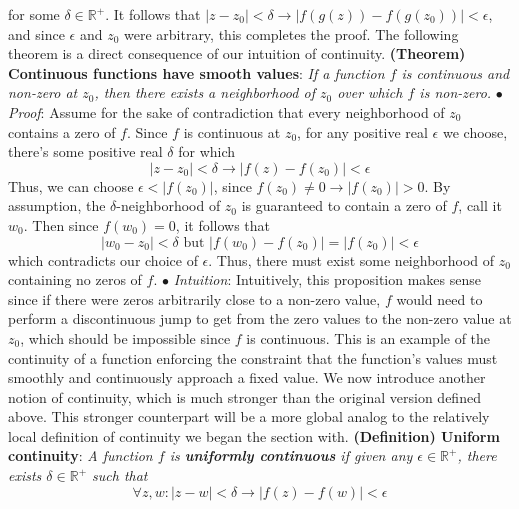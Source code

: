 \documentclass{article}
\newcommand*{\tb}{\textbf}
\newcommand*{\ti}{\textit}
\newcommand*{\n}{\newline}
\newcommand*{\nn}{\newline \newline}
\newcommand*{\Pf}{\indent \ensuremath{\bullet} \textit{Proof}: }
\newcommand*{\In}{\indent \ensuremath{\bullet} \textit{Intuition}: }
\newcommand*{\R}{\mathbb{R}}
\begin{document}
for some $ \delta \in \R^+ $. It follows that $ | z - z_0 | < \delta \rightarrow | f(g(z)) - f(g(z_0)) | < \epsilon $, and since $ \epsilon $ and $ z_0 $ were arbitrary, this completes the proof. \qedsymbol
\nn
The following theorem is a direct consequence of our intuition of continuity.
\nn
\tb{(Theorem) Continuous functions have smooth values}: \ti{If a function $ f $ is continuous and non-zero at $ z_0 $, then there exists a neighborhood of $ z_0 $ over which $ f $ is non-zero.}
\n
\Pf Assume for the sake of contradiction that every neighborhood of $ z_0 $ contains a zero of $ f $. Since $ f $ is continuous at $ z_0 $, for any positive real $ \epsilon $ we choose, there's some positive real $ \delta $ for which
$$ | z - z_0 | < \delta \rightarrow | f(z) - f(z_0) | < \epsilon $$
Thus, we can choose $ \epsilon < | f(z_0) | $, since $ f(z_0) \neq 0 \rightarrow | f(z_0) | > 0 $. By assumption, the $ \delta $-neighborhood of $ z_0 $ is guaranteed to contain a zero of $ f $, call it $ w_0 $. Then since $ f(w_0) = 0 $, it follows that
$$ | w_0 - z_0 | < \delta \text{ but } | f(w_0) - f(z_0) | = | f(z_0) | < \epsilon $$
which contradicts our choice of $ \epsilon $. Thus, there must exist some neighborhood of $ z_0 $ containing no zeros of $ f $. \qedsymbol
\n
\In Intuitively, this proposition makes sense since if there were zeros arbitrarily close to a non-zero value, $ f $ would need to perform a discontinuous jump to get from the zero values to the non-zero value at $ z_0 $, which should be impossible since $ f $ is continuous. This is an example of the continuity of a function enforcing the constraint that the function's values must smoothly and continuously approach a fixed value.
\n
We now introduce another notion of continuity, which is much stronger than the original version defined above. This stronger counterpart will be a more global analog to the relatively local definition of continuity we began the section with.
\nn
\tb{(Definition) Uniform continuity}: \ti{A function $ f $ is \tb{uniformly continuous} if given any $ \epsilon \in \R^+ $, there exists $ \delta \in \R^+ $ such that}
$$ \forall z, w: | z - w | < \delta \rightarrow | f(z) - f(w) | < \epsilon $$
\n
\end{document}
